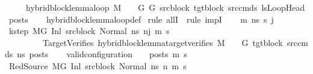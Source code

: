 \begin{isabellebody}
\ \ \ \ \ {\isachardoublequoteopen}hybrid{\isacharunderscore}{\kern0pt}block{\isacharunderscore}{\kern0pt}lemma{\isacharunderscore}{\kern0pt}loop\ M\ {\isasymLambda}\ {\isasymGamma}\ {\isasymOmega}\ G\ G{\isacharprime}{\kern0pt}\ src{\isacharunderscore}{\kern0pt}block\ tgt{\isacharunderscore}{\kern0pt}block\ src{\isacharunderscore}{\kern0pt}cmds\ lsLoopHead\ posts{\isachardoublequoteclose}\isanewline
%
\isadelimproof
\ \ %
\endisadelimproof
%
\isatagproof
{}\isamarkupfalse%
\ hybrid{\isacharunderscore}{\kern0pt}block{\isacharunderscore}{\kern0pt}lemma{\isacharunderscore}{\kern0pt}loop{\isacharunderscore}{\kern0pt}def\isanewline
{}\isamarkupfalse%
\ {\isacharparenleft}{\kern0pt}rule\ allI\ {\isacharbar}{\kern0pt}\ rule\ impI{\isacharparenright}{\kern0pt}{\isacharplus}{\kern0pt}\isanewline
\ \ \isamarkupfalse%
\ m{\isacharprime}{\kern0pt}\ ns\ s{\isacharprime}{\kern0pt}\ j\isanewline
\ \ \isamarkupfalse%
\ k{\isacharunderscore}{\kern0pt}step{\isacharcolon}{\kern0pt}\ {\isachardoublequoteopen}M{\isacharcomma}{\kern0pt}{\isasymLambda}{\isacharcomma}{\kern0pt}{\isasymGamma}{\isacharcomma}{\kern0pt}{\isasymOmega}{\isacharcomma}{\kern0pt}G\ {\isasymturnstile}{\isacharparenleft}{\kern0pt}Inl\ src{\isacharunderscore}{\kern0pt}block{\isacharcomma}{\kern0pt}\ Normal\ ns{\isacharparenright}{\kern0pt}\ {\isacharminus}{\kern0pt}n{\isasymrightarrow}{\isacharcircum}{\kern0pt}j\ {\isacharparenleft}{\kern0pt}m{\isacharprime}{\kern0pt}{\isacharcomma}{\kern0pt}\ s{\isacharprime}{\kern0pt}{\isacharparenright}{\kern0pt}{\isachardoublequoteclose}\ \isanewline
\ \ \ \ \ \ \ \ \ TargetVerifies{\isacharcolon}{\kern0pt}\ {\isachardoublequoteopen}hybrid{\isacharunderscore}{\kern0pt}block{\isacharunderscore}{\kern0pt}lemma{\isacharunderscore}{\kern0pt}target{\isacharunderscore}{\kern0pt}verifies\ M\ {\isasymLambda}\ {\isasymGamma}\ {\isasymOmega}\ G{\isacharprime}{\kern0pt}\ tgt{\isacharunderscore}{\kern0pt}block\ src{\isacharunderscore}{\kern0pt}cmds\ ns\ posts{\isachardoublequoteclose}\isanewline
\ \ \isamarkupfalse%
\ {\isachardoublequoteopen}valid{\isacharunderscore}{\kern0pt}configuration\ {\isasymLambda}\ {\isasymGamma}\ {\isasymOmega}\ posts\ m{\isacharprime}{\kern0pt}\ s{\isacharprime}{\kern0pt}{\isachardoublequoteclose}\isanewline
\ \ \isamarkupfalse%
\ {\isacharminus}{\kern0pt}\isanewline
\ \ \ \ \isamarkupfalse%
\ RedSource{\isacharcolon}{\kern0pt}\ {\isachardoublequoteopen}M{\isacharcomma}{\kern0pt}{\isasymLambda}{\isacharcomma}{\kern0pt}{\isasymGamma}{\isacharcomma}{\kern0pt}{\isasymOmega}{\isacharcomma}{\kern0pt}G\ {\isasymturnstile}{\isacharparenleft}{\kern0pt}Inl\ src{\isacharunderscore}{\kern0pt}block{\isacharcomma}{\kern0pt}\ Normal\ ns{\isacharparenright}{\kern0pt}\ {\isacharminus}{\kern0pt}n{\isasymrightarrow}{\isacharasterisk}{\kern0pt}\ {\isacharparenleft}{\kern0pt}m{\isacharprime}{\kern0pt}{\isacharcomma}{\kern0pt}\ s{\isacharprime}{\kern0pt}{\isacharparenright}{\kern0pt}{\isachardoublequoteclose}\isanewline

\end{isabellebody}
